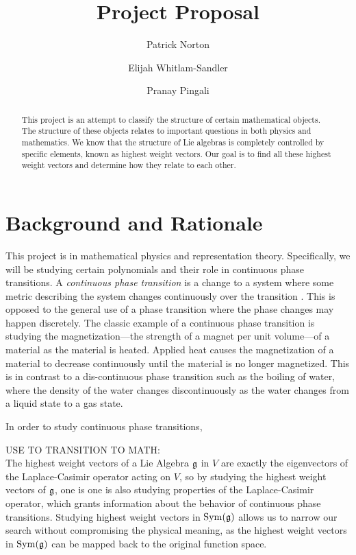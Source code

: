 \documentclass[11pt, reqno]{amsart}
\title{Project Proposal}
\author{Patrick Norton \and Elijah Whitlam-Sandler \and Pranay Pingali}
\begin{document}
\maketitle

\begin{abstract}
  This project is an attempt to classify the structure of certain mathematical
  objects. %
  The structure of these objects relates to important questions in both
  physics and mathematics. %
  We know that the structure of Lie algebras is completely controlled by
  specific elements, known as highest weight vectors. Our goal is to find all
  these highest weight vectors and determine how they relate to each other.
\end{abstract}

\section{Background and Rationale}

This project is in mathematical physics and representation theory. Specifically, we will be studying certain polynomials and their role in continuous phase transitions. A \emph{continuous phase transition} is a change to a system where some metric describing the system changes continuously over the transition \cite[\S1]{Sa06}. This is opposed to the general use of a phase transition where the phase changes may happen discretely. The classic example of a continuous phase transition is studying the magnetization---the strength of a magnet per unit volume---of a material as the material is heated. Applied heat causes the magnetization of a material to decrease continuously until the material is no longer magnetized. This is in contrast to a dis-continuous phase transition such as the boiling of water, where the density of the water changes discontinuously as the water changes from a liquid state to a gas state.

In order to study continuous phase transitions, 

USE TO TRANSITION TO MATH:\\
The highest weight vectors of a Lie Algebra $\mathfrak{g}$ in $V$ are exactly the eigenvectors 
of the Laplace-Casimir operator acting on $V$, so by studying the highest weight  
vectors of $\mathfrak{g}$, one is one is also studying properties of the Laplace-Casimir 
operator, which grants information about the behavior of continuous phase transitions. 
Studying highest weight vectors in $\operatorname{Sym}(\mathfrak{g})$ allows us to narrow our search without
compromising the physical meaning, as the highest weight vectors in $\operatorname{Sym}(\mathfrak{g})$ can be mapped back to the original function space. 
\end{document}
